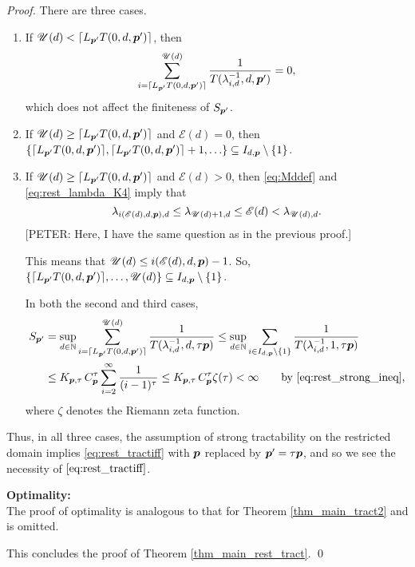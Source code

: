 \documentclass[sort&compress]{elsarticle}
\newcommand{\theM}{\mathscr{E}}
\newcommand{\theUB}{\mathscr{U}}
\newcommand{\peter}[1]{\begingroup\color{violet}#1\endgroup}
\begin{document}
\begin{proof}
There are three cases.
\begin{enumerate}
\renewcommand{\labelenumi}{\roman{enumi})}


\item If $\theUB(d) <\lceil L_{\vp'} T(0,d,\vp')\rceil$, then 
\[
\sum_{i = \lceil L_{\vp'} T(0,d,\vp')\rceil }^{\theUB(d)} \frac{1}{T (\lambda_{i,d}^{-1},d, \vp')} = 0,
\]
which does not affect the finiteness of $S_{\boldsymbol{p}'}$.

\item If $\theUB(d) \ge \lceil L_{\vp'} T(0,d,\vp')\rceil$ and $\theM(d) = 0$, then $\{\lceil L_{\boldsymbol{p}'} T(0,d,\boldsymbol{p}')\rceil,  \lceil L_{\boldsymbol{p}'} T(0,d,\boldsymbol{p}')\rceil + 1, \ldots \} \subseteq I_{d,\boldsymbol{p}} \setminus \{1\}$.  

\item If $\theUB(d) \ge \lceil L_{\vp'} T(0,d,\vp')\rceil$ and $\theM(d) >0$, then \eqref{eq:Mddef} and \eqref{eq:rest_lambda_K4} imply that
\[
\lambda_{i(\theM(d),d,\vp),d} \le \lambda_{\theUB(d)+1,d} \le \theM(d) < \lambda_{\theUB(d),d}.
\]
\peter{[PETER: Here, I have the same question as in the previous proof.]}

This means that $\theUB(d) \le i(\theM(d),d,\vp)-1$.  So, $\{ \lceil L_{\vp'} T(0,d,\vp')\rceil, \ldots, \theUB(d)\} \subseteq I_{d,\vp} \setminus \{1\}$. 

In both the second and third cases,
\begin{align*}
S_{\vp'} & = \sup_{d\in\naturals} \sum_{i =  \lceil L_{\vp'} T(0,d,\vp')\rceil}^{\theUB(d)} \frac{1}{T (\lambda_{i,d}^{-1},d, \tau \vp)}
\le 
\sup_{d\in\naturals} \sum_{i \in I_{d,\vp} \setminus\{1\} } \frac{1}{T (\lambda_{i,d}^{-1},1, \tau \vp)} \\
&  \le  K_{\vp,\tau}\, C_{\vp}^\tau
\sum_{i=2}^\infty \frac{1}{(i-1)^\tau}
 \le K_{\vp,\tau}\, C_{\vp}^\tau
\zeta (\tau) 
 < \infty \qquad \text{by \eqref{eq:rest_strong_ineq},}
\end{align*}
where $\zeta$ denotes the Riemann zeta function.

\end{enumerate}
Thus, in all three cases, the assumption of strong tractability on the restricted domain implies \eqref{eq:rest_tractiff} with $\boldsymbol{p}$ replaced by $\boldsymbol{p}' = \tau \boldsymbol{p}$, and so we see the necessity of $\eqref{eq:rest_tractiff}$.
\bigskip


\bigskip

\noindent \textbf{Optimality:} \\
The proof of optimality is analogous to that for Theorem \ref{thm_main_tract2} and is omitted.

\bigskip

\noindent 
This concludes the proof of Theorem \ref{thm_main_rest_tract}.  \qed
\end{proof}
\end{document}
